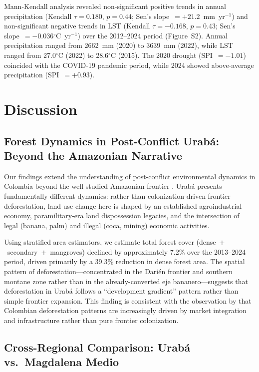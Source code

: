 \documentclass[12pt,a4paper]{article}
\begin{document}
Mann-Kendall analysis revealed non-significant positive trends in annual precipitation (Kendall $\tau = 0.180$, $p = 0.44$; Sen's slope~$= +21.2$~mm~yr$^{-1}$) and non-significant negative trends in LST (Kendall $\tau = -0.168$, $p = 0.43$; Sen's slope~$= -0.036$$^\circ$C~yr$^{-1}$) over the 2012--2024 period (Figure~S2). Annual precipitation ranged from \num{2662}~mm (2020) to \num{3639}~mm (2022), while LST ranged from 27.0$^\circ$C (2022) to 28.6$^\circ$C (2015). The 2020 drought (SPI~$= -1.01$) coincided with the COVID-19 pandemic period, while 2024 showed above-average precipitation (SPI~$= +0.93$).


\section{Discussion}

\subsection{Forest Dynamics in Post-Conflict Urab\'{a}: Beyond the Amazonian Narrative}

Our findings extend the understanding of post-conflict environmental dynamics in Colombia beyond the well-studied Amazonian frontier \citep{Prem2020,Clerici2020,MurilloSandoval2021}. Urab\'{a} presents fundamentally different dynamics: rather than colonization-driven frontier deforestation, land use change here is shaped by an established agroindustrial economy, paramilitary-era land dispossession legacies, and the intersection of legal (banana, palm) and illegal (coca, mining) economic activities.

Using \citet{Olofsson2014} stratified area estimators, we estimate total forest cover (dense~$+$~secondary~$+$~mangroves) declined by approximately 7.2\% over the 2013--2024 period, driven primarily by a 39.3\% reduction in dense forest area. The spatial pattern of deforestation---concentrated in the Dari\'{e}n frontier and southern montane zone rather than in the already-converted eje bananero---suggests that deforestation in Urab\'{a} follows a ``development gradient'' pattern rather than simple frontier expansion. This finding is consistent with the observation by \citet{Armenteras2013,Armenteras2019} that Colombian deforestation patterns are increasingly driven by market integration and infrastructure rather than pure frontier colonization.

\subsection{Cross-Regional Comparison: Urab\'{a} vs.\ Magdalena Medio}
\end{document}
